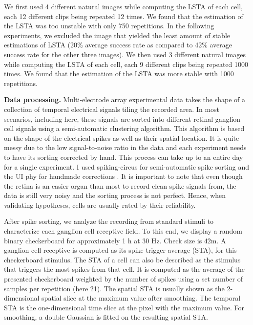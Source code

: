 We first used 4 different natural images while computing the LSTA of each cell,
each 12 different clips being repeated 12 times. We found that the estimation
of the LSTA was too unstable with only 750 repetitions. In the following
experiments, we excluded the image that yielded the least amount of stable
estimations of LSTA (20\% average success rate as compared to 42\% average
success rate for the other three images). We then used 3 different natural
images while computing the LSTA of each cell, each 9 different clips being
repeated 1000 times. We found that the estimation of the LSTA was more stable
with 1000 repetitions.

\textbf{Data processing.}
Multi-electrode array experimental data takes the shape of a collection of
temporal electrical signals tiling the recorded area.
In most scenarios, including here, these signals are sorted into different
retinal ganglion cell
signals using a semi-automatic clustering algorithm. This algorithm is based on
the shape
of the electrical spikes as well as their spatial location. It is
quite messy due to the low signal-to-noise ratio in the data and each
experiment needs to have its sorting corrected by hand.
This process can take up to an
entire day for a single experiment. I used spiking-circus for semi-automatic
spike sorting and the UI phy for handmade corrections \citep{yger_spike_2018}.
It is important to note that even though the retina is an easier organ than
most to record clean spike signals from, the data is still very noisy and the
sorting process is not perfect. Hence, when validating hypotheses, cells are
usually rated by their reliability.

After spike sorting, we analyze the recording from standard stimuli to
characterize each
ganglion cell receptive field. To this end, we display a random binary
checkerboard for approximately 1 h at 30 Hz. Check size is 42\textmu m. A
ganglion cell receptive is computed as its spike trigger average (STA), for
this checkerboard stimulus. The STA of a cell can also be described as the
stimulus that triggers the most spikes from that cell. It is computed as the
average of the presented checkerboard weighted by the number of spikes using a
set number of samples per repetition (here 21). The spatial STA is usually
shown as the 2-dimensional spatial slice at the maximum value after smoothing.
The temporal STA is the one-dimensional time slice at the pixel with the
maximum
value. For smoothing, a double Gaussian is fitted on the resulting spatial
STA.

